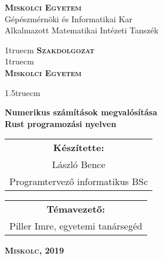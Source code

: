 

\pagestyle{empty} %

\begin{flushleft}
\textsc{\bfseries Miskolci Egyetem}\\
Gépészmérnöki és Informatikai Kar\\
Alkalmazott Matematikai Intézeti Tanszék
\end{flushleft}

{\large
\begin{center}
\vglue 1truecm
\textbf{\huge\textsc{Szakdolgozat}}\\
\vglue 1truecm
\\
\textbf{\textsc{Miskolci Egyetem}}
\end{center}}

\vglue 1.5truecm %

{\LARGE
\begin{center}
\textbf{Numerikus számítások megvalósítása \\ Rust programozási nyelven}
\end{center}}

\vspace*{2.5truecm}
{\large
\begin{center}
\begin{tabular}{c}
\textbf{Készítette:}\\
László Bence\\
Programtervező informatikus BSc
\end{tabular}
\end{center}
\begin{center}
\begin{tabular}{c}
\textbf{Témavezető:}\\
Piller Imre, egyetemi tanársegéd
\end{tabular}
\end{center}}
\vfill
{\large
\begin{center}
\textbf{\textsc{Miskolc, 2019}}
\end{center}}

\newpage
